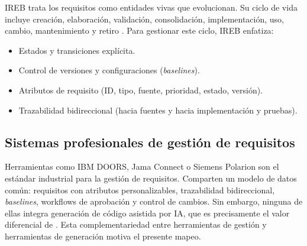 IREB trata los requisitos como entidades vivas que evolucionan. Su ciclo de vida incluye creaci\'on, elaboraci\'on, validaci\'on, consolidaci\'on, implementaci\'on, uso, cambio, mantenimiento y retiro \cite[pp.~130--140]{cpre}. Para gestionar este ciclo, IREB enfatiza:

\begin{itemize}
    \item Estados y transiciones expl\'icita.
    \item Control de versiones y configuraciones (\emph{baselines}).
    \item Atributos de requisito (ID, tipo, fuente, prioridad, estado, versi\'on).
    \item Trazabilidad bidireccional (hacia fuentes y hacia implementaci\'on y pruebas).
\end{itemize}

\subsection{Sistemas profesionales de gesti\'on de requisitos}

Herramientas como IBM DOORS, Jama Connect o Siemens Polarion son el est\'andar industrial para la gesti\'on de requisitos. Comparten un modelo de datos com\'un: requisitos con atributos personalizables, trazabilidad bidireccional, \emph{baselines}, workflows de aprobaci\'on y control de cambios. Sin embargo, ninguna de ellas integra generaci\'on de c\'odigo asistida por IA, que es precisamente el valor diferencial de \speckit. Esta complementariedad entre herramientas de gesti\'on y herramientas de generaci\'on motiva el presente mapeo.
